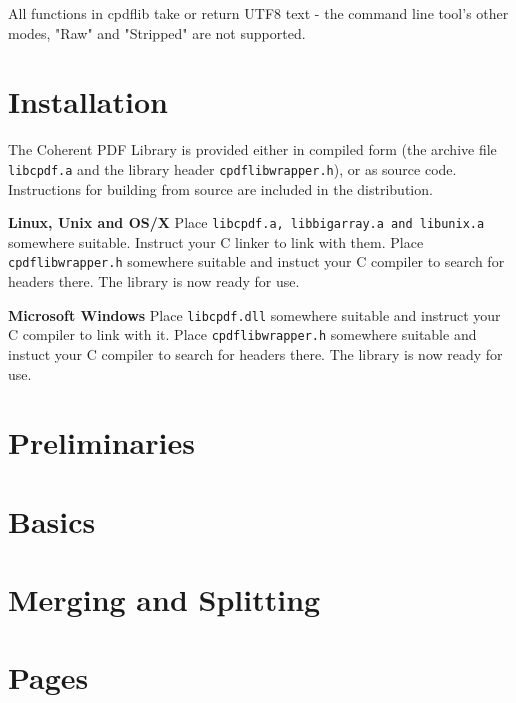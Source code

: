 \documentclass[a4paper]{memoir}
\begin{document}
All functions in cpdflib take or return UTF8 text - the command line tool's other modes, "Raw" and "Stripped" are not supported.

\chapter*{Installation}
The Coherent PDF Library is provided either in compiled form (the archive file \texttt{libcpdf.a} and the library header \texttt{cpdflibwrapper.h}), or as source code. Instructions for building from source are included in the distribution.

\textbf{Linux, Unix and OS/X} Place \texttt{libcpdf.a, libbigarray.a and libunix.a} somewhere suitable. Instruct your C linker to link with them. Place \texttt{cpdflibwrapper.h} somewhere suitable and instuct your C compiler to search for headers there. \noindent The library is now ready for use.

\textbf{Microsoft Windows} Place \texttt{libcpdf.dll} somewhere suitable and instruct your C compiler to link with it. Place \texttt{cpdflibwrapper.h} somewhere suitable and instuct your C compiler to search for headers there. \noindent The library is now ready for use.

\setcounter{chapter}{-1}
\chapter{Preliminaries}

\begin{small}


\end{small}

\chapter{Basics}

\begin{small}

\end{small}

\chapter{Merging and Splitting}
\begin{small}
\end{small}

\chapter{Pages}
\begin{small}
\end{small}
\end{document}
